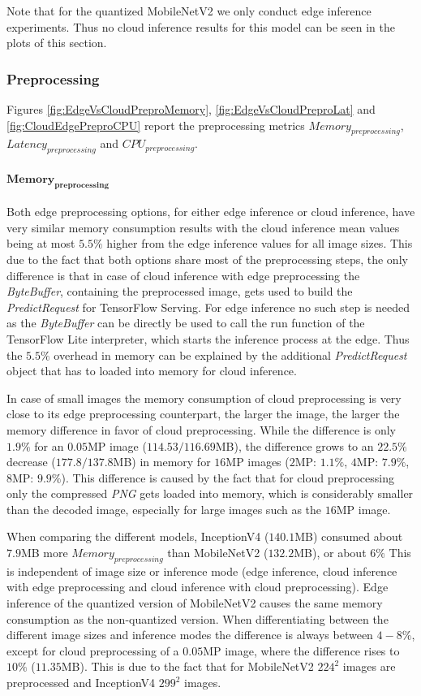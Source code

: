 Note that for the quantized MobileNetV2 we only conduct edge inference experiments. Thus no cloud inference results for this model can be seen in the plots of this section.
\subsubsection{Preprocessing}

Figures \ref{fig:EdgeVsCloudPreproMemory}, \ref{fig:EdgeVsCloudPreproLat} and \ref{fig:CloudEdgePreproCPU} report the preprocessing metrics $Memory_{preprocessing}$, $Latency_{preprocessing}$ and $CPU_{preprocessing}$.

\paragraph{$\mathbf{Memory_{preprocessing}}$}
Both edge preprocessing options, for either edge inference or cloud inference, have very similar memory consumption results with the cloud inference mean values being at most $5.5\%$ higher from the edge inference values for all image sizes.
This due to the fact that both options share most of the preprocessing steps, the only difference is that in case of cloud inference with edge preprocessing the \emph{ByteBuffer}, containing the preprocessed image, gets used to build the \emph{PredictRequest} for TensorFlow Serving. 
For edge inference no such step is needed as the \emph{ByteBuffer} can be directly be used to call the run function of the TensorFlow Lite interpreter, which starts the inference process at the edge.
Thus the $5.5\%$ overhead in memory can be explained by the additional \emph{PredictRequest} object that has to loaded into memory for cloud inference.

In case of small images the memory consumption of cloud preprocessing is very close to its edge preprocessing counterpart, the larger the image, the larger the memory difference in favor of cloud preprocessing.
While the difference is only $1.9\%$ for an $0.05$MP image ($114.53/116.69$MB), the difference grows to an $22.5\%$ decrease ($177.8/137.8$MB) in memory for $16$MP images ($2$MP: $1.1\%$, $4$MP: $7.9\%$, $8$MP: $9.9\%$).
This difference is caused by the fact that for cloud preprocessing only the compressed \emph{PNG} gets loaded into memory, which is considerably smaller than the decoded image, especially for large images such as the $16$MP image.

When comparing the different models, InceptionV4 ($140.1$MB) consumed about $7.9$MB more $Memory_{preprocessing}$ than MobileNetV2 ($132.2$MB), or about $6\%$ This is independent of image size or inference mode (edge inference, cloud inference with edge preprocessing and cloud inference with cloud preprocessing).
Edge inference of the quantized version of MobileNetV2 causes the same memory consumption as the non-quantized version.
When differentiating between the different image sizes and inference modes the difference is always between $4-8\%$, except for cloud preprocessing of a $0.05$MP image, where the difference rises to $10\%$ ($11.35$MB). This is due to the fact that for MobileNetV2 $224^2$ images are preprocessed and InceptionV4 $299^2$ images.

